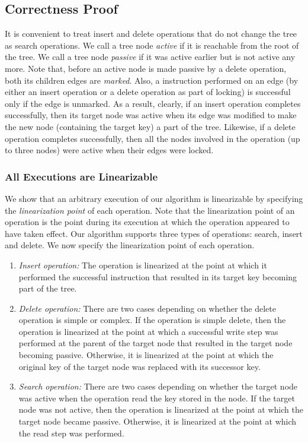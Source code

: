 \subsection{Correctness Proof}
It is convenient to treat insert and delete operations that do not change the tree as search operations. We call a tree node \emph{active} if it is reachable from the root of the 
tree. We call a tree node  \emph{passive} if it was active earlier but is not active any more. Note that, before an active node is made passive by a delete operation, both its 
children edges are \emph{marked}. Also, a \CAS{} instruction performed on an edge (by either an insert operation or a delete operation as part of locking) is successful only if the edge is unmarked. As a result, clearly, if an insert operation completes successfully, then  its target node was active when its edge was modified to make the new node (containing the target key) a part of the tree. Likewise, if a delete operation completes successfully, then all the nodes involved in the operation (up to three nodes) were active when their edges were locked.

\subsubsection{All Executions are Linearizable}

We show that an arbitrary execution of our algorithm is linearizable by specifying the \emph{linearization point} of each operation. Note that the linearization point of an operation is the point during its execution at which the operation appeared to have taken effect. Our algorithm supports three types of operations: search, insert and delete. We now specify the linearization point of each operation.

\begin{enumerate}[leftmargin=*]
\item \emph{Insert operation:} The operation is linearized at the point at which it performed the successful \CAS{} instruction that resulted in its target key becoming part of the tree.					
\item \emph{Delete operation:} There are two cases depending on whether the delete operation is simple or complex. If the operation is simple delete, then the operation is linearized at the point at which a successful write step was performed at the parent of the target node that resulted in the target node becoming passive. Otherwise, it is linearized at the point at which the original key of the target node was replaced with its successor key.   
\item \emph{Search operation:} There are two cases depending on whether the target node was active when the operation read the key stored in the node. If the target node was not active, then the operation is linearized at the point at which the target node became passive. Otherwise, it is linearized at the point at which the read step was performed.
\end{enumerate}

